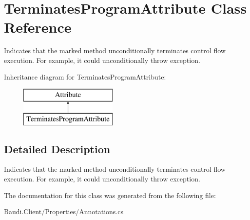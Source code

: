 \hypertarget{class_terminates_program_attribute}{}\section{Terminates\+Program\+Attribute Class Reference}
\label{class_terminates_program_attribute}


Indicates that the marked method unconditionally terminates control flow execution. For example, it could unconditionally throw exception.  


Inheritance diagram for Terminates\+Program\+Attribute\+:\begin{figure}[H]
\begin{center}
\leavevmode
\includegraphics[height=2.000000cm]{class_terminates_program_attribute}
\end{center}
\end{figure}


\subsection{Detailed Description}
Indicates that the marked method unconditionally terminates control flow execution. For example, it could unconditionally throw exception. 



The documentation for this class was generated from the following file\+:\begin{DoxyCompactItemize}
\item 
Baudi.\+Client/\+Properties/Annotations.\+cs\end{DoxyCompactItemize}
